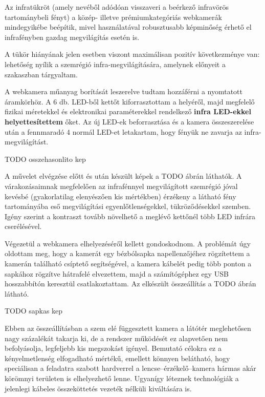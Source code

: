 Az infratükröt (amely nevéből adódóan visszaveri a beérkező infravörös tartománybeli fényt) a közép- illetve prémiumkategóriás webkamerák mindegyikébe beépítik, mivel használatával robusztusabb képminőség érhető el infrafényben gazdag megvilágítás esetén is.

A tükör hiányának jelen esetben viszont maximálisan pozitív következménye van: lehetőség nyílik a szemrégió infra-megvilágítására, amelynek előnyeit a  szakaszban tárgyaltam.

\bigskip

A webkamera műanyag borítását leszerelve tudtam hozzáférni a nyomtatott áramkörhöz. A 6 db. LED-ből kettőt kiforrasztottam a helyéről, majd megfelelő fizikai méretekkel és elektronikai paraméterekkel rendelkező \textbf{infra LED-ekkel helyettesítettem} őket. Az új LED-ek beforrasztása és a kamera összeszerelése után a fennmaradó 4 normál LED-et letakartam, hogy fényük ne zavarja az infra-megvilágítást.

TODO osszehasonlito kep

A művelet elvégzése előtt és után készült képek a TODO ábrán láthatók. A várakozásaimnak megfelelően az infrafénnyel megvilágított szemrégió jóval kevésbé (gyakorlatilag elenyészően kis mértékben) érzékeny a látható fény tartományába eső megvilágítási egyenlőtlenségekkel, tükröződésekkel szemben. Igény szerint a kontraszt tovább növelhető a meglévő kettőnél több LED infrára cserélésével.

\bigskip

Végezetül a webkamera elhelyezéséről kellett gondoskodnom. A problémát úgy oldottam meg, hogy a kamerát egy bézbólsapka napellenzőjéhez rögzítettem a kamerán található csíptető segítségével, a kamera kábelét pedig több ponton a sapkához rögzítve hátrafelé elvezettem, majd a számítógéphez egy USB hosszabbítón keresztül csatlakoztattam. Az elkészült összeállítás a TODO ábrán látható.

TODO sapkas kep

Ebben az összeállításban a szem elé függesztett kamera a látótér meglehetősen nagy százalékát takarja ki, de a rendszer működését ez alapvetően nem befolyásolja, legfeljebb kis megszokást igényel. Bemutató célokra ez a kényelmetlenség elfogadható mértékű, emellett könnyen belátható, hogy speciálisan a feladatra szabott hardverrel a lencse--érzékelő--kamera hármas akár körömnyi területen is elhelyezhető lenne. Ugyanígy léteznek technológiák a jelenlegi kábeles összeköttetés vezeték nélküli kiváltására is.